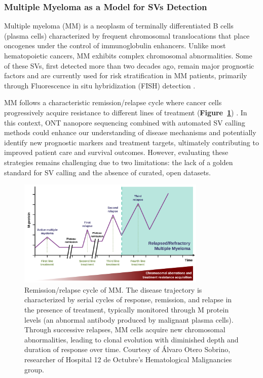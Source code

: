 \subsubsection{Multiple Myeloma as a Model for SVs Detection}

Multiple myeloma (MM) is a neoplasm of terminally differentiated B cells (plasma 
cells) characterized by frequent chromosomal translocations that place oncogenes 
under the control of immunoglobulin enhancers. Unlike most hematopoietic cancers, 
MM exhibits complex chromosomal abnormalities. Some of these SVs, first detected 
more than two decades ago, remain major prognostic factors 
and are currently used for risk stratification in MM patients, primarily through 
Fluorescence in situ hybridization (FISH) detection \cite{kuehl_multiple_2002}.

MM follows a characteristic remission/relapse cycle where cancer cells progressively 
acquire resistance to different lines of treatment (\textbf{Figure~\ref{fig:evo_MM}})
\cite{kurtin_relapsed_2013}. In this context, ONT nanopore sequencing combined 
with automated SV calling methods could enhance our understanding of disease 
mechanisms and potentially identify new prognostic markers and treatment 
targets, ultimately contributing to improved patient care and survival outcomes. 
However, evaluating these strategies remains challenging due to two limitations: 
the lack of a golden standard for SV calling and the absence of curated, open 
datasets.

\begin{figure}[H]
    \centering
    \includegraphics[width=0.8\textwidth]{img/evo_MM.png}
    \caption[Remission/relapse cycle of Multiple Myeloma]{Remission/relapse 
    cycle of MM. The disease trajectory is characterized by serial cycles of 
    response, remission, and relapse in the presence of treatment, typically 
    monitored through M protein levels (an abnormal antibody produced by 
    malignant plasma cells). Through successive relapses, MM cells acquire new 
    chromosomal abnormalities, leading to clonal evolution with diminished 
    depth and duration of response over time. Courtesy of Álvaro Otero Sobrino, 
    researcher of Hospital 12 de Octubre's Hematological Malignancies group.}
    \label{fig:evo_MM}
\end{figure}